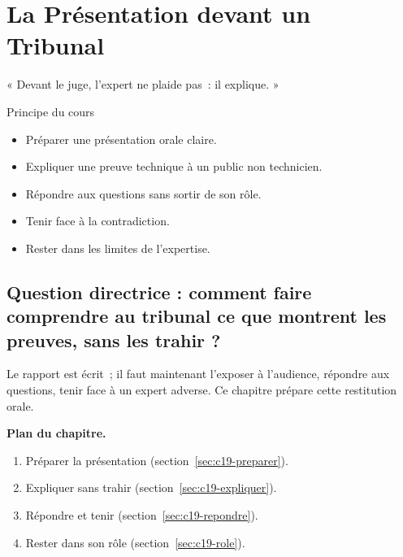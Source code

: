 
\chapter{La Présentation devant un Tribunal}
\label{chap:tribunal}

\epigraph{%
    « Devant le juge, l'expert ne plaide pas~: il explique. »%
}{Principe du cours}


\begin{boxobjectifs}
\begin{itemize}
    \item Préparer une présentation orale claire.
    \item Expliquer une preuve technique à un public non technicien.
    \item Répondre aux questions sans sortir de son rôle.
    \item Tenir face à la contradiction.
    \item Rester dans les limites de l'expertise.
\end{itemize}
\end{boxobjectifs}

\bigskip

\section*{Question directrice : comment faire comprendre au tribunal ce que montrent les preuves, sans les trahir ?}

Le rapport est écrit~; il faut maintenant l'exposer à l'audience, répondre aux
questions, tenir face à un expert adverse. Ce chapitre prépare cette
restitution orale.

\medskip
\textbf{Plan du chapitre.}
\begin{enumerate}
    \item Préparer la présentation (section~\ref{sec:c19-preparer}).
    \item Expliquer sans trahir (section~\ref{sec:c19-expliquer}).
    \item Répondre et tenir (section~\ref{sec:c19-repondre}).
    \item Rester dans son rôle (section~\ref{sec:c19-role}).
\end{enumerate}

